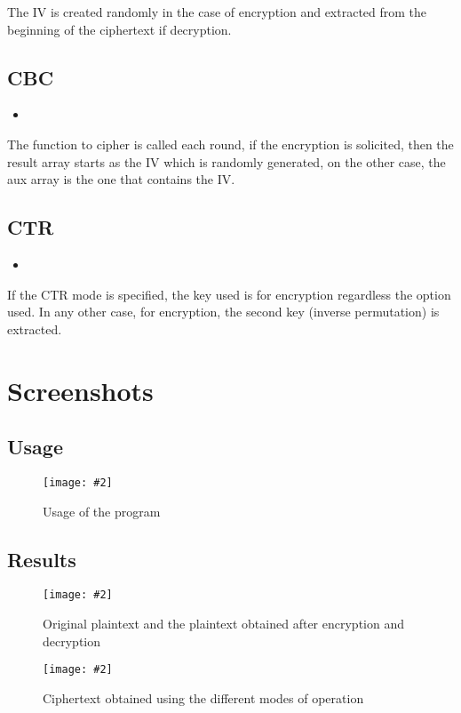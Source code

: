 \documentclass[titlepage, 12pt]{article}
\numberwithin{equation}{section}%
\numberwithin{figure}{section}%
\numberwithin{table}{section}%
\newcommand{\imagen}[4][]{
	\begin{figure}[H]
		\centering
		\texttt{[image: \#2]}
		\caption{#3}
		#4
	\end{figure}
}
\newcommand{\delimitCodeScript}[6][]{
	\begin{itemize}
		\item[]
	\end{itemize}	
}
\begin{document}
		The IV is created randomly in the case of encryption and extracted from the beginning of the ciphertext if decryption.
		\subsection{CBC}
		\delimitCodeScript{cpp}{Functions}{CBC operation mode}{97}{113}
		The function to cipher is called each round, if the encryption is solicited, then the result array starts as the IV which is randomly generated, on the other case, the aux array is the one that contains the IV.
		\subsection{CTR}
		\delimitCodeScript{cpp}{Functions}{CTR operation mode}{114}{121}
		If the CTR mode is specified, the key used is for encryption regardless the option used. In any other case, for encryption, the second key (inverse permutation) is extracted.
	\section{Screenshots}
	\subsection{Usage}
		\imagen[width=\linewidth]{Picture1}{Usage of the program}{\label{Usage}}
	\subsection{Results}
		\imagen[width=\linewidth]{Picture2}{Original plaintext and the plaintext obtained after encryption and decryption}{\label{Plaintext}}
		\imagen[width=\linewidth]{Picture3}{Ciphertext obtained using the different modes of operation}{\label{Ciphertext}}
	
	
\end{document}
